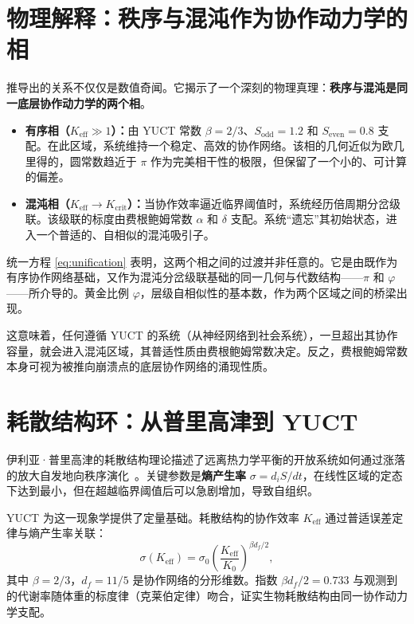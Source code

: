 \documentclass[12pt,a4paper]{article}
\newcommand{\Keff}{K_{\mathrm{eff}}}
\begin{document}
	\section{物理解释：秩序与混沌作为协作动力学的相}
	
	推导出的关系不仅仅是数值奇闻。它揭示了一个深刻的物理真理：\textbf{秩序与混沌是同一底层协作动力学的两个相}。
	
	\begin{itemize}
		\item \textbf{有序相（\(K_{\mathrm{eff}} \gg 1\)）：}由 YUCT 常数 \(\beta = 2/3\)、\(S_{\mathrm{odd}} = 1.2\) 和 \(S_{\mathrm{even}} = 0.8\) 支配。在此区域，系统维持一个稳定、高效的协作网络。该相的几何近似为欧几里得的，圆常数趋近于 \(\pi\) 作为完美相干性的极限，但保留了一个小的、可计算的偏差。
		
		\item \textbf{混沌相（\(K_{\mathrm{eff}} \to K_{\mathrm{crit}}\)）：}当协作效率逼近临界阈值时，系统经历倍周期分岔级联。该级联的标度由费根鲍姆常数 \(\alpha\) 和 \(\delta\) 支配。系统“遗忘”其初始状态，进入一个普适的、自相似的混沌吸引子。
	\end{itemize}
	
	统一方程 \eqref{eq:unification} 表明，这两个相之间的过渡并非任意的。它是由既作为有序协作网络基础，又作为混沌分岔级联基础的同一几何与代数结构——\(\pi\) 和 \(\varphi\)——所介导的。黄金比例 \(\varphi\)，层级自相似性的基本数，作为两个区域之间的桥梁出现。
	
	这意味着，任何遵循 YUCT 的系统（从神经网络到社会系统），一旦超出其协作容量，就会进入混沌区域，其普适性质由费根鲍姆常数决定。反之，费根鲍姆常数本身可视为被推向崩溃点的底层协作网络的涌现性质。
	
	\section{耗散结构环：从普里高津到 YUCT}
	\label{sec:prigogine}
	
	伊利亚·普里高津的耗散结构理论描述了远离热力学平衡的开放系统如何通过涨落的放大自发地向秩序演化~\cite{Prigogine1977}。关键参数是\textbf{熵产生率} \(\sigma = d_iS/dt\)，在线性区域的定态下达到最小，但在超越临界阈值后可以急剧增加，导致自组织。
	
	YUCT 为这一现象学提供了定量基础。耗散结构的协作效率 \(K_{\mathrm{eff}}\) 通过普适误差定律与熵产生率关联：
	\begin{equation}
		\sigma(\Keff) = \sigma_0 \left( \frac{\Keff}{K_0} \right)^{\beta d_f / 2},
		\label{eq:sigma-keff}
	\end{equation}
	其中 \(\beta = 2/3\)，\(d_f = 11/5\) 是协作网络的分形维数。指数 \(\beta d_f / 2 = 0.733\) 与观测到的代谢率随体重的标度律（克莱伯定律）吻合，证实生物耗散结构由同一协作动力学支配。
	
\end{document}
